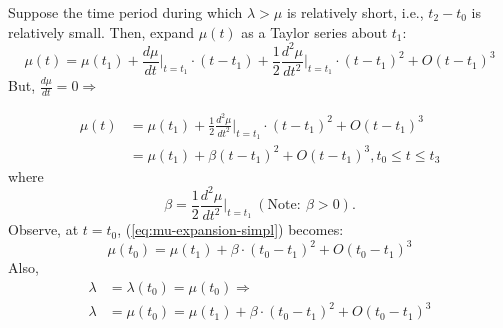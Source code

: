 \documentclass[12pt]{report}
\renewcommand{\fixme}[3][]{#1\xspace}
\newcounter{time}
\newcounter{space}
\begin{document}
Suppose the time period during which $\lambda > \mu$ is relatively
short, i.e., $t_2 - t_0$ is relatively small.\fixme{caltrans}{Demand
  is greater than capacity between t0 and t2.  From t2 to t3 the
  capacity exceeds the demand.  From your explanation, it appears that
  this time period should be t2-t0 rather than t3-t0!  Please
  explain. To be consistent with equation 3.25, this time period
  should be t2-t0.  crindt: The critique is correct, it should be
  $t_2-t_0$} Then, expand $\mu(t)$ as a Taylor series about $t_1$:
\begin{equation}
  \label{eq:mu-expansion}
  \mu(t) = \mu(t_1)+\frac{d\mu}{dt}\Biggr\rvert_{t=t_1} \cdot{}(t-t_1)
  +\frac{1}{2}\frac{d^2\mu}{dt^2}\Biggr\rvert_{t=t_1} \cdot{}(t-t_1)^2
  +O(t-t_1)^3
\end{equation}
But, $\frac{d\mu}{dt} = 0 \Rightarrow$
%
\fixme{caltrans}{What are the reasons and the logic that are needed to
  make Taylor Series applicable.  Can this assumption be used during a
  major incident where blockage is present for over an hour?  crindt:
  Indeed, the longer the incident, the less valid this result is.
  However, keep in mind that the methods described herein are focused
  on identifying delay savings due to TMC actions that speed the
  clearance of accidents.  In the case of an incident that requires a
  long duration to clear, the importance of the speed of the response
  is diminished.  Put more bluntly, if it takes 6 hours to clear an
  incident, then it matter little in terms of total delay whether the
  first response is 10 minutes slower or faster.}
\begin{equation}
\begin{split}
  \label{eq:mu-expansion-simpl}
  \mu(t) & = \mu(t_1)+\frac{1}{2}\frac{d^2\mu}{dt^2}\Biggr\rvert_{t=t_1}\cdot(t-t_1)^2+O(t-t_1)^3 \\
  ~& = \mu(t_1)+\beta (t-t_1)^2 + O(t-t_1)^3, t_0 \le t \le t_3
\end{split}
\end{equation}
where
\begin{equation}
  \label{eq:beta}
  \beta = \frac{1}{2}\frac{d^2\mu}{dt^2}\Biggr\rvert_{t=t_1} \: (\mathrm{Note:}\: \beta > 0).
\end{equation}
Observe, at $t=t_0$, (\ref{eq:mu-expansion-simpl}) becomes:
\begin{equation}
  \label{eq:mu-at-t0}
  \mu(t_0) = \mu(t_1) + \beta \cdot (t_0-t_1)^2+O(t_0-t_1)^3
\end{equation}
Also, 
\begin{equation}
  \label{eq:lambda-at-t0}
\begin{split}
  \lambda & = \lambda(t_0) = \mu(t_0) \Rightarrow \\
  \lambda & = \mu(t_0) = \mu(t_1) + \beta \cdot
  (t_0-t_1)^2+O(t_0-t_1)^3
\end{split}
\end{equation}
\end{document}
